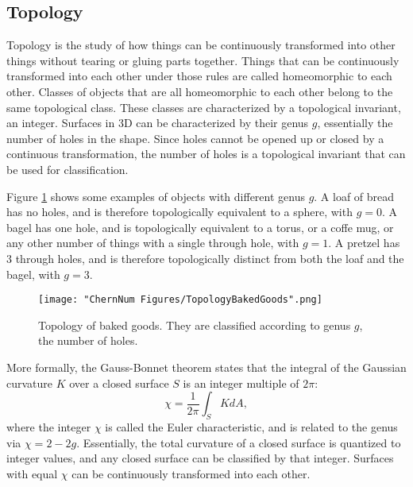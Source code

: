 \subsection{Topology}
Topology is the study of how things can be continuously transformed into other things without tearing or gluing parts together. Things that can be continuously transformed into each other under those rules are called homeomorphic to each other. Classes of objects that are all homeomorphic to each other belong to the same topological class. These classes are characterized by a topological invariant, an integer. Surfaces in 3D can be characterized by their genus $g$, essentially the number of holes in the shape. Since holes cannot be opened up or closed by a continuous transformation, the number of holes is a topological invariant that can be used for classification. 

Figure \ref{fig:bakedGoods} shows some examples of objects with different genus $g$. A loaf of bread has no holes, and is therefore topologically equivalent to a sphere, with $g=0$. A bagel has one hole, and is topologically equivalent to a torus, or a coffe mug, or any other number of things with a single through hole, with $g=1$. A pretzel has $3$ through holes, and is therefore topologically distinct from both the loaf and the bagel, with $g=3$. 
\begin{figure}
	\texttt{[image: "ChernNum Figures/TopologyBakedGoods".png]}
\label{fig:bakedGoods}
\caption[Topology of baked goods]{Topology of baked goods. They are classified according to genus $g$, the number of holes.}
\end{figure}

More formally, the Gauss-Bonnet theorem states that the integral of the Gaussian curvature $K$ over a closed surface $S$ is an integer multiple of $2\pi$:
\begin{equation}
\chi = \frac{1}{2\pi}\int_S K dA,
\label{eqn:GaussBonnet}
\end{equation}
where the integer $\chi$ is called the Euler characteristic, and is related to the genus via $\chi = 2 - 2g$. Essentially, the total curvature of a closed surface is quantized to integer values, and any closed surface can be classified by that integer. Surfaces with equal $\chi$ can be continuously transformed into each other.

